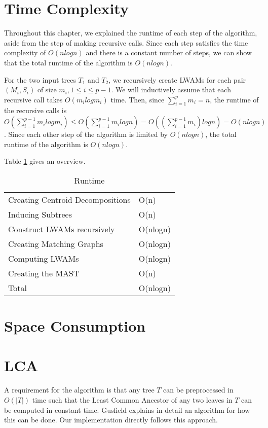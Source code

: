 \section{Time Complexity}
Throughout this chapter, we explained the runtime of each step of the algorithm, aside from the step of making recursive calls. Since each step satisfies the time complexity of $O(nlogn)$ and there is a constant number of steps, we can show that the total runtime of the algorithm is $O(nlogn)$.

For the two input trees $T_1$ and $T_2$, we recursively create LWAMs for each pair $(M_i, S_i)$ of size $m_i, 1 \le i \le p-1$. We will inductively assume that each recursive call takes $O(m_ilogm_i)$ time. Then, since $\sum_{i=1}^p m_i = n$, the runtime of the recursive calls is $O(\sum_{i=1}^{p-1} m_ilogm_i) \le O(\sum_{i=1}^{p-1} m_ilogn) = O((\sum_{i=1}^{p-1} m_i)logn) = O(nlogn)$. Since each other step of the algorithm is limited by $O(nlogn)$, the total runtime of the algorithm is $O(nlogn)$.

Table \ref{runtimeTable} gives an overview.
\begin{table}[]
	\centering
	\begin{tabular}{l|l}
		Creating Centroid Decompositions & O(n)     \\
		Inducing Subtrees                & O(n)     \\
		Construct LWAMs recursively		 & O(nlogn) \\
		Creating Matching Graphs         & O(nlogn) \\
		Computing LWAMs                  & O(nlogn) \\
		Creating the MAST                & O(n)     \\ \hline
		Total                            & O(nlogn)
	\end{tabular}
	\caption{Runtime}
	\label{runtimeTable}
\end{table}

\section{Space Consumption}


\section{LCA}
\label{lcaSection}
A requirement for the algorithm is that any tree $T$ can be preprocessed in $O(|T|)$ time such that the Least Common Ancestor of any two leaves in $T$ can be computed in constant time. Gusfield \cite{gusfield} explains in detail an algorithm for how this can be done. Our implementation directly follows this approach.


